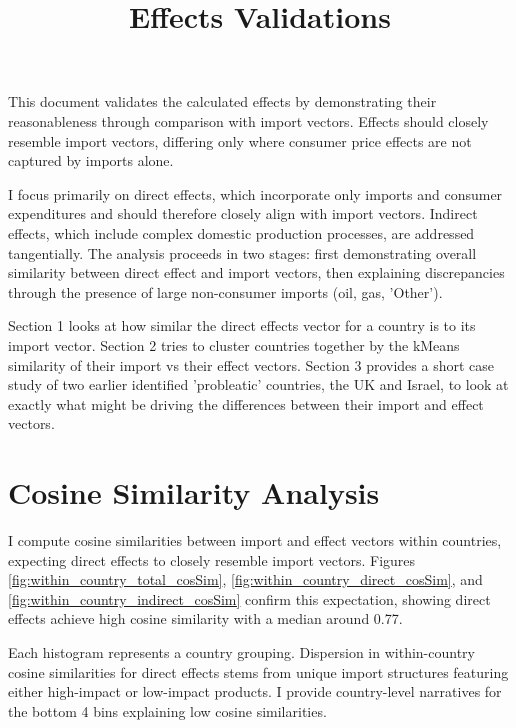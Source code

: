 \documentclass{article}
\begin{document}
\title{Effects Validations}
\maketitle

This document validates the calculated effects by demonstrating their reasonableness through comparison with import vectors. Effects should closely resemble import vectors, differing only where consumer price effects are not captured by imports alone. 

I focus primarily on direct effects, which incorporate only imports and consumer expenditures and should therefore closely align with import vectors. Indirect effects, which include complex domestic production processes, are addressed tangentially. The analysis proceeds in two stages: first demonstrating overall similarity between direct effect and import vectors, then explaining discrepancies through the presence of large non-consumer imports (oil, gas, 'Other').

Section 1 looks at how similar the direct effects vector for a country is to its import vector. Section 2 tries to cluster countries together by the kMeans similarity of their import vs their effect vectors. Section 3 provides a short case study of two 
earlier identified 'probleatic' countries, the UK and Israel, to look at exactly what might be driving the differences between their import and effect vectors.

\section{Cosine Similarity Analysis}
I compute cosine similarities between import and effect vectors within countries, expecting direct effects to closely resemble import vectors. Figures \ref{fig:within_country_total_cosSim}, \ref{fig:within_country_direct_cosSim}, and \ref{fig:within_country_indirect_cosSim} confirm this expectation, showing direct effects achieve high cosine similarity with a median around 0.77.

Each histogram represents a country grouping. Dispersion in within-country cosine similarities for direct effects stems from unique import structures featuring either high-impact or low-impact products. I provide country-level narratives for the bottom 4 bins explaining low cosine similarities. 
\end{document}
